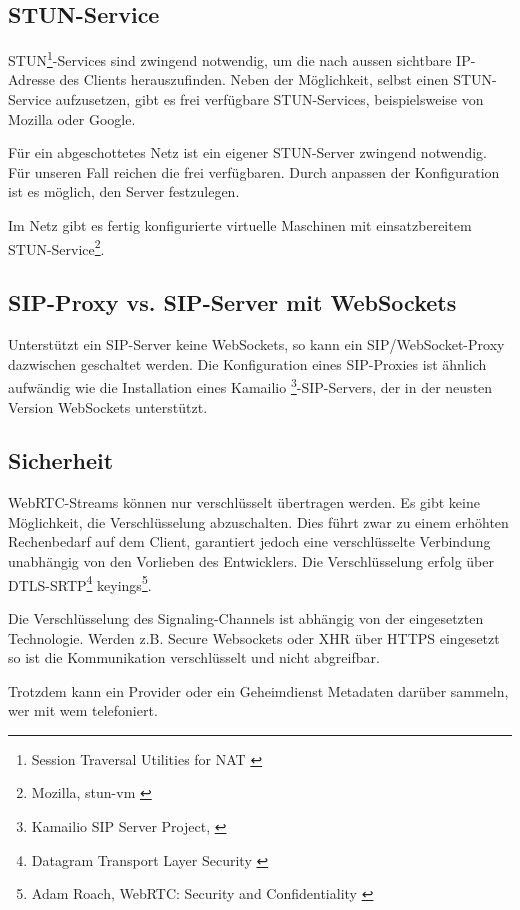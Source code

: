 	\subsection{STUN-Service}
		STUN\footnote{Session Traversal Utilities for NAT \cite{IETF-STUN-RFC}}-Services sind zwingend
		notwendig, um die nach aussen sichtbare IP-Adresse des Clients herauszufinden.
		Neben der Möglichkeit, selbst einen STUN-Service aufzusetzen, gibt es frei
		verfügbare STUN-Services, beispielsweise von Mozilla oder Google.

		Für ein abgeschottetes Netz ist ein eigener STUN-Server zwingend notwendig.
		Für unseren Fall reichen die frei verfügbaren. Durch anpassen der
		Konfiguration ist es möglich, den Server festzulegen.

		Im Netz gibt es fertig konfigurierte virtuelle Maschinen mit einsatzbereitem
		STUN-Service\footnote{Mozilla, stun-vm \cite{Mozilla-STUN-VM}}.

	\subsection{SIP-Proxy vs. SIP-Server mit WebSockets}
		Unterstützt ein SIP-Server keine WebSockets, so kann ein SIP/WebSocket-Proxy
		dazwischen geschaltet werden. Die Konfiguration eines SIP-Proxies ist ähnlich
		aufwändig wie die Installation eines Kamailio
		\footnote{Kamailio SIP Server Project, \cite{Kamailio-Project}}-SIP-Servers, der in der neusten Version WebSockets unterstützt.

	\subsection{Sicherheit}
		WebRTC-Streams können nur verschlüsselt übertragen werden. Es gibt keine
		Möglichkeit, die Verschlüsselung abzuschalten. Dies führt zwar zu einem
		erhöhten Rechenbedarf auf dem Client, garantiert jedoch eine verschlüsselte
		Verbindung unabhängig von den Vorlieben des Entwicklers.
		Die Verschlüsselung erfolg über DTLS-SRTP\footnote{Datagram Transport Layer Security \cite{IETF-DTLS-RFC}} 
		keyings\footnote{Adam Roach, WebRTC: Security and Confidentiality \cite{AdamRoach-WebRTC-Security}}. 
		
		Die Verschlüsselung des Signaling-Channels ist abhängig von der eingesetzten
		Technologie. Werden z.B. Secure Websockets oder XHR über HTTPS eingesetzt so ist die Kommunikation verschlüsselt und nicht abgreifbar.
		
		Trotzdem kann ein Provider oder ein Geheimdienst Metadaten darüber sammeln, wer mit wem telefoniert.
		  
